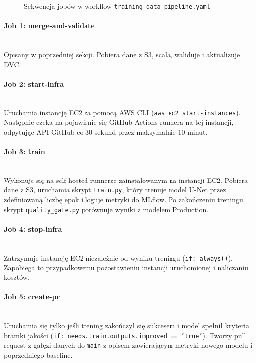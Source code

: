 \begin{figure}[H]
\centering
\caption{Sekwencja jobów w workflow \texttt{training-data-pipeline.yaml}}
\label{fig:workflow-jobs}
\end{figure}

\paragraph{Job 1: merge-and-validate}\mbox{}\\
Opisany w poprzedniej sekcji. Pobiera dane z S3, scala, waliduje i aktualizuje DVC.

\paragraph{Job 2: start-infra}\mbox{}\\
Uruchamia instancję EC2 za pomocą AWS CLI (\texttt{aws ec2 start-instances}). Następnie czeka na pojawienie się GitHub Actions runnera na tej instancji, odpytując API GitHub co 30 sekund przez maksymalnie 10 minut.

\paragraph{Job 3: train}\mbox{}\\
Wykonuje się na self-hosted runnerze zainstalowanym na instancji EC2. Pobiera dane z S3, uruchamia skrypt \texttt{train.py}, który trenuje model U-Net przez zdefiniowaną liczbę epok i loguje metryki do MLflow. Po zakończeniu treningu skrypt \texttt{quality\_gate.py} porównuje wyniki z modelem Production.

\paragraph{Job 4: stop-infra}\mbox{}\\
Zatrzymuje instancję EC2 niezależnie od wyniku treningu (\texttt{if: always()}). Zapobiega to przypadkowemu pozostawieniu instancji uruchomionej i naliczaniu kosztów.

\paragraph{Job 5: create-pr}\mbox{}\\
Uruchamia się tylko jeśli trening zakończył się sukcesem i model spełnił kryteria bramki jakości (\texttt{if: needs.train.outputs.improved == 'true'}). Tworzy pull request z gałęzi danych do \texttt{main} z opisem zawierającym metryki nowego modelu i poprzedniego baseline.

